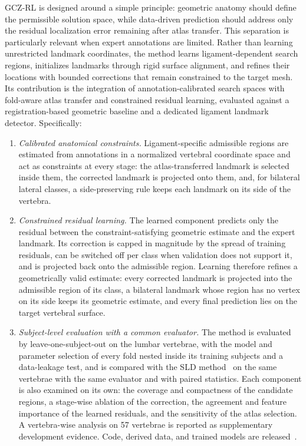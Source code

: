 \documentclass[5p,times,twocolumn,authoryear]{elsarticle}
\newif\ifhighlight
\newcommand{\rev}[1]{\ifhighlight{\color{revcolor}#1}\else#1\fi}
\begin{document}
GCZ-RL is designed around a simple principle: geometric anatomy should define the permissible solution space, while data-driven prediction should address only the residual localization error remaining after atlas transfer. This separation is particularly relevant when expert annotations are limited. Rather than learning unrestricted landmark coordinates, the method learns ligament-dependent search regions, initializes landmarks through rigid surface alignment, and refines their locations with bounded corrections that remain constrained to the target mesh. Its contribution is the integration of annotation-calibrated search spaces with fold-aware atlas transfer and constrained residual learning, evaluated against a registration-based geometric baseline and a dedicated ligament landmark detector. Specifically:
\begin{enumerate}[leftmargin=2em,itemsep=2pt,topsep=2pt]
  \item \textit{Calibrated anatomical constraints.} Ligament-specific admissible regions are estimated from annotations in a normalized vertebral coordinate space and act as constraints at every stage: \rev{the atlas-transferred landmark is selected inside them, the corrected landmark is projected onto them, and, for bilateral lateral classes, a side-preserving rule keeps each landmark on its side of the vertebra.}
  \item \textit{Constrained residual learning.} The learned component predicts only the residual between the constraint-satisfying geometric estimate and the expert landmark. Its correction is capped in magnitude by the spread of training residuals, can be switched off per class when validation does not support it, and is projected back onto the admissible region. Learning therefore refines a geometrically valid estimate: \rev{every corrected landmark is projected into the admissible region of its class, a bilateral landmark whose region has no vertex on its side keeps its geometric estimate, and every final prediction lies on the target vertebral surface.}
  \item \textit{Subject-level evaluation with a common evaluator.} The method is evaluated by leave-one-subject-out on the lumbar vertebrae, with the model and parameter selection of every fold nested inside its training subjects and a data-leakage test, and is compared with the SLD method~\citep{blomenkamp2026sld} on the same vertebrae with the same evaluator and with paired statistics. \rev{Each component is also examined on its own: the coverage and compactness of the candidate regions, a stage-wise ablation of the correction, the agreement and feature importance of the learned residuals, and the sensitivity of the atlas selection.} A vertebra-wise analysis on 57 vertebrae is reported as supplementary development evidence. Code, derived data, and trained models are released~\citep{gczrl2026code}.
\end{enumerate}
\end{document}
